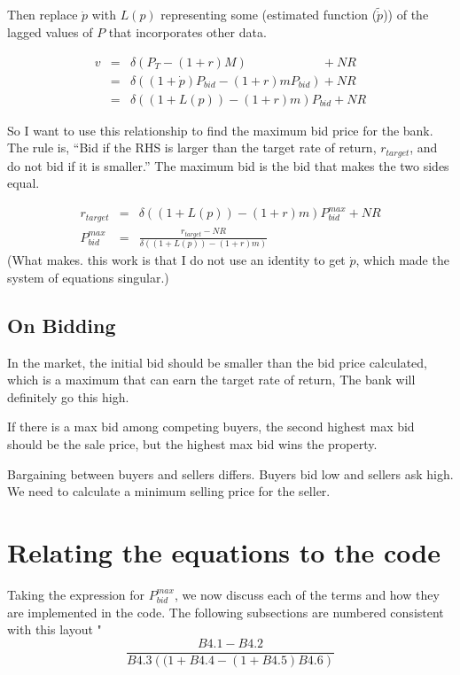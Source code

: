 Then replace   $\dot p$ with $L(p)$ representing some (estimated function ($\tilde{\dot p}$)) of the lagged values of $P$ that incorporates other data. 

\begin{eqnarray}
v&=& \delta(P_T- (1+r)M) \qquad \qquad \qquad 	 + NR \nonumber\\
 &=&\delta\left( (1+\dot p)P_{bid} - (1+r)mP_{bid} \right)  + NR  \nonumber\\
  &=&\delta\left( (1+L(p)) - (1+r)m \right) P_{bid} + NR  \nonumber
\end{eqnarray}


So I want to use this relationship to find the maximum bid price for the bank. The rule is, ``Bid if the RHS is larger than the target rate of return, $r_{target}$, and do not bid if it is smaller.''  The maximum bid  is the bid that makes the two sides equal. 

{\color{red}
\begin{eqnarray}
r_{target}&=& \delta\left( (1+L(p)) - (1+r)m \right) P^{max}_{bid} + NR  \nonumber\\
   P^{max}_{bid} &=&\frac{r_{target}-NR}{\delta\left( (1+L(p)) - (1+r)m \right)} \label{EqBidPrice} 
\end{eqnarray}}
(What makes. this work is that I do not use an identity to get
$\dot p$, which made the system of equations singular.)
\newpage

\subsection{On Bidding}

In the market, the initial bid should be smaller than the bid price calculated, which is a maximum that can earn the target rate of return, The bank will definitely go this high. 

If there is a  max bid among competing buyers, the second highest max bid should be the sale price, but the highest max bid wins the property.

Bargaining between buyers and sellers differs. Buyers bid low and sellers ask high.  {\color{red}We need to calculate a minimum selling price for the seller}.



\section{Relating the equations to the code}
Taking the expression for $P^{max}_{bid}$, we now discuss each of the terms and how they are implemented in the code. The following subsections are numbered consistent with this layout "
\[\frac{B4.1-B4.2}{B4.3\left( (1+B4.4 - (1+B4.5)B4.6\right)}\]

